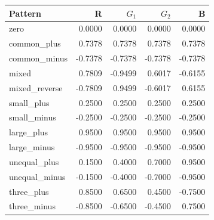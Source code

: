 \begin{inlinetable}
\centering
\caption{Example P01 offset labels (DN), in the channel order of Fig.~\ref{fig:ptc}.}\label{tab:patterns}
\footnotesize
\setlength{\tabcolsep}{4pt}
\begin{tabular}{lrrrr}
\toprule
Pattern & R & $G_1$ & $G_2$ & B \\
\midrule
zero & 0.0000 & 0.0000 & 0.0000 & 0.0000 \\
common\_plus & 0.7378 & 0.7378 & 0.7378 & 0.7378 \\
common\_minus & -0.7378 & -0.7378 & -0.7378 & -0.7378 \\
mixed & 0.7809 & -0.9499 & 0.6017 & -0.6155 \\
mixed\_reverse & -0.7809 & 0.9499 & -0.6017 & 0.6155 \\
small\_plus & 0.2500 & 0.2500 & 0.2500 & 0.2500 \\
small\_minus & -0.2500 & -0.2500 & -0.2500 & -0.2500 \\
large\_plus & 0.9500 & 0.9500 & 0.9500 & 0.9500 \\
large\_minus & -0.9500 & -0.9500 & -0.9500 & -0.9500 \\
unequal\_plus & 0.1500 & 0.4000 & 0.7000 & 0.9500 \\
unequal\_minus & -0.1500 & -0.4000 & -0.7000 & -0.9500 \\
three\_plus & 0.8500 & 0.6500 & 0.4500 & -0.7500 \\
three\_minus & -0.8500 & -0.6500 & -0.4500 & 0.7500 \\
\bottomrule
\end{tabular}
\end{inlinetable}
